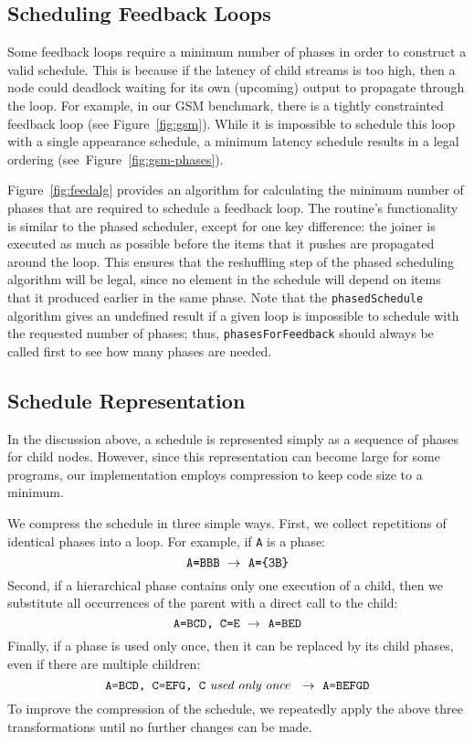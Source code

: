 \subsection{Scheduling Feedback Loops}

Some feedback loops require a minimum number of phases in order to
construct a valid schedule.  This is because if the latency of child
streams is too high, then a node could deadlock waiting for its own
(upcoming) output to propagate through the loop.  For example, in our
GSM benchmark, there is a tightly constrainted feedback loop (see
Figure~\ref{fig:gsm}).  While it is impossible to schedule this loop
with a single appearance schedule, a minimum latency schedule results
in a legal ordering (see~Figure~\ref{fig:gsm-phases}).

Figure~\ref{fig:feedalg} provides an algorithm for calculating the
minimum number of phases that are required to schedule a feedback
loop.  The routine's functionality is similar to the phased scheduler,
except for one key difference: the joiner is executed as much as
possible before the items that it pushes are propagated around the
loop.  This ensures that the reshuffling step of the phased scheduling
algorithm will be legal, since no element in the schedule will depend
on items that it produced earlier in the same phase.  Note that the
{\tt phasedSchedule} algorithm gives an undefined result if a given
loop is impossible to schedule with the requested number of phases;
thus, {\tt phasesForFeedback} should always be called first to see how
many phases are needed.

\subsection{Schedule Representation}
\label{sec:schedrep}

In the discussion above, a schedule is represented simply as a
sequence of phases for child nodes.  However, since this
representation can become large for some programs, our implementation
employs compression to keep code size to a minimum.  

We compress the schedule in three simple ways.  First, we collect
repetitions of identical phases into a loop.  For example, if {\tt A}
is a phase:
\[
\mbox{{\tt A=BBB}} ~\rightarrow~ \mbox{{\tt A=\{3B\}}}
\]
Second, if a hierarchical phase contains only one execution of a
child, then we substitute all occurrences of the parent with a direct
call to the child:
\[
\mbox{{\tt A=BCD, C=E}} ~\rightarrow~ \mbox{{\tt A=BED}}
\]
Finally, if a phase is used only once, then it can be replaced by its
child phases, even if there are multiple children:
\[
\mbox{{\tt A=BCD, C=EFG, C}}~\mbox{\it used}~\mbox{\it only}~\mbox{\it once}~ ~\rightarrow~ \mbox{{\tt A=BEFGD}}
\]
To improve the compression of the schedule, we repeatedly apply the
above three transformations until no further changes can be made.

